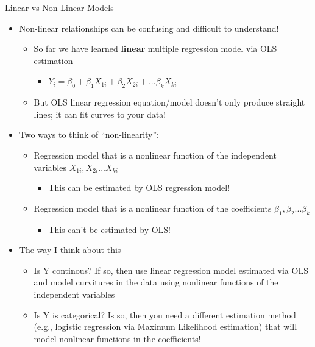 \documentclass[8pt,ignorenonframetext,dvipsnames]{beamer}
\providecommand{\tightlist}{%
  \setlength{\itemsep}{0pt}\setlength{\parskip}{0pt}}
\renewcommand{\textbf}[1]{{\color{darkgray}\bfseries\fontfamily{Montserrat-TOsF}#1}}
\let\olditem\item
\renewcommand{\item}{%
  \olditem\vspace{4pt}
}
\begin{document}
\begin{frame}{Linear vs Non-Linear Models}
\protect\hypertarget{linear-vs-non-linear-models}{}

\begin{itemize}
\tightlist
\item
  Non-linear relationships can be confusing and difficult to understand!

  \begin{itemize}
  \tightlist
  \item
    So far we have learned \textbf{linear} multiple regression model via
    OLS estimation

    \begin{itemize}
    \tightlist
    \item
      \(Y_i = \beta_0 + \beta_1X_{1i} + \beta_2X_{2i} + ... \beta_kX_{ki}\)
    \end{itemize}
  \item
    But OLS linear regression equation/model doesn't only produce
    straight lines; it can fit curves to your data!
  \end{itemize}
\item
  Two ways to think of ``non-linearity'':

  \begin{itemize}
  \tightlist
  \item
    Regression model that is a nonlinear function of the independent
    variables \(X_{1i}, X_{2i}... X_{ki}\)

    \begin{itemize}
    \tightlist
    \item
      This can be estimated by OLS regression model!
    \end{itemize}
  \item
    Regression model that is a nonlinear function of the coefficients
    \(\beta_1, \beta_2... \beta_k\)

    \begin{itemize}
    \tightlist
    \item
      This can't be estimated by OLS!
    \end{itemize}
  \end{itemize}
\item
  The way I think about this

  \begin{itemize}
  \tightlist
  \item
    Is Y continous? If so, then use linear regression model estimated
    via OLS and model curvitures in the data using nonlinear functions
    of the independent variables
  \item
    Is Y is categorical? Is so, then you need a different estimation
    method (e.g., logistic regression via Maximum Likelihood estimation)
    that will model nonlinear functions in the coefficients!


\end{itemize}
\end{itemize}
\end{frame}
\end{document}
